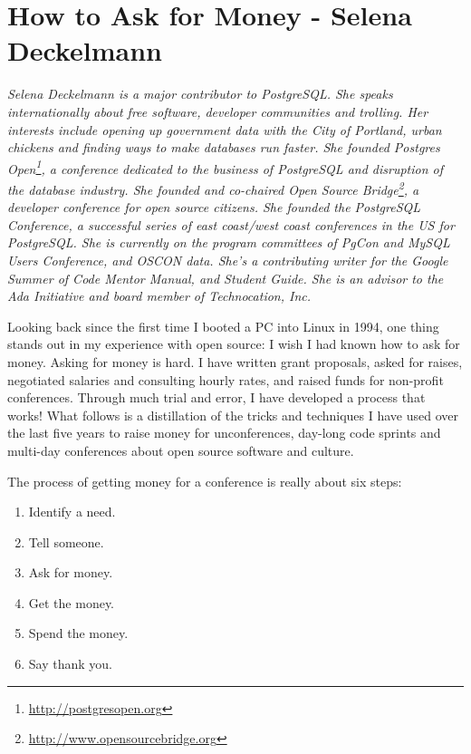 \chapter{How to Ask for Money - Selena Deckelmann}

\textit{Selena Deckelmann is a major contributor to PostgreSQL. She speaks
internationally about free software, developer communities and trolling. Her
interests include opening up government data with the City of Portland, urban
chickens and finding ways to make databases run faster.
\newline
She founded Postgres Open\footnote{\url{http://postgresopen.org}}, a conference
dedicated to the business of PostgreSQL and disruption of the database industry.
She founded and co-chaired Open Source
Bridge\footnote{\url{http://www.opensourcebridge.org}}, a developer conference
for open source citizens. She founded the PostgreSQL Conference, a successful
series of east coast/west coast conferences in the US for PostgreSQL. She is
currently on the program committees of PgCon and MySQL Users Conference, and
OSCON data. She's a contributing writer for the Google Summer of Code Mentor
Manual, and Student Guide. She is an advisor to the Ada Initiative and board
member of Technocation, Inc.}


Looking back since the first time I booted a PC into Linux in 1994, one thing
stands out in my experience with open source: I wish I had known how to
ask for money.
Asking for money is hard. I have written grant proposals, asked for raises,
negotiated salaries and consulting hourly rates, and raised funds for non-profit
conferences. Through much trial and error, I have developed a process that
works!
What follows is a distillation of the tricks and techniques I have used over the
last five years to raise money for unconferences, day-long code sprints and
multi-day conferences about open source software and culture.

The process of getting money for a conference is really about six steps: 
\begin{enumerate}
 \item Identify a need. 
 \item Tell someone. 
 \item Ask for money.
 \item Get the money.
 \item Spend the money. 
 \item Say thank you.
\end{enumerate}

